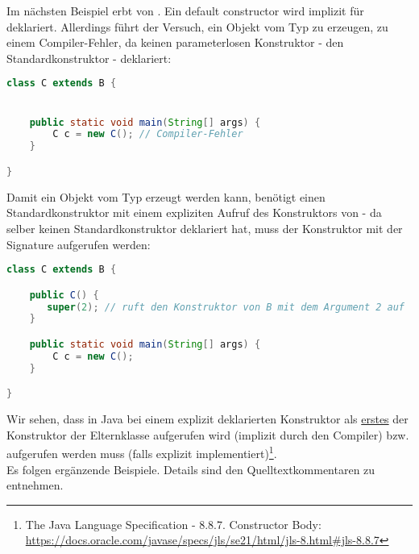 Im nächsten Beispiel erbt   von . Ein default constructor wird implizit für  deklariert. Allerdings
führt der Versuch, ein Objekt vom Typ  zu erzeugen, zu einem Compiler-Fehler, da  keinen parameterlosen
Konstruktor - den Standardkonstruktor - deklariert:


\begin{lstlisting}[language=java]
class C extends B {


    public static void main(String[] args) {
        C c = new C(); // Compiler-Fehler
    }

}
\end{lstlisting}

Damit ein Objekt vom Typ  erzeugt werden kann, benötigt  einen Standardkonstruktor mit einem expliziten
Aufruf des Konstruktors von  - da  selber keinen Standardkonstruktor deklariert hat, muss der Konstruktor
mit der Signature  aufgerufen werden:

\begin{lstlisting}[language=java]
class C extends B {

    public C() {
       super(2); // ruft den Konstruktor von B mit dem Argument 2 auf
    }

    public static void main(String[] args) {
        C c = new C();
    }

}
\end{lstlisting}

Wir sehen, dass in Java bei einem explizit deklarierten Konstruktor als \underline{erstes}
der Konstruktor der Elternklasse aufgerufen wird (implizit durch den Compiler) bzw. aufgerufen werden muss (falls explizit implementiert)\footnote{
    The Java Language Specification - 8.8.7. Constructor Body: \url{https://docs.oracle.com/javase/specs/jls/se21/html/jls-8.html#jls-8.8.7}
}.\\

Es folgen ergänzende Beispiele. Details sind den Quelltextkommentaren zu entnehmen.

